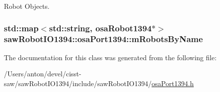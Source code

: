Robot Objects. 

\hypertarget{classsaw_robot_i_o1394_1_1osa_port1394_a43429f6b99e3a27ba60a626d3ab83367}{}
\subsubsection[{m\+Robots\+By\+Name}]{\setlength{\rightskip}{0pt plus 5cm}std\+::map$<$std\+::string, {\bf osa\+Robot1394}$\ast$$>$ saw\+Robot\+I\+O1394\+::osa\+Port1394\+::m\+Robots\+By\+Name\hspace{0.3cm}{\ttfamily [protected]}}\label{classsaw_robot_i_o1394_1_1osa_port1394_a43429f6b99e3a27ba60a626d3ab83367}


The documentation for this class was generated from the following file\+:\begin{DoxyCompactItemize}
\item 
/\+Users/anton/devel/cisst-\/saw/saw\+Robot\+I\+O1394/include/saw\+Robot\+I\+O1394/\hyperlink{osa_port1394_8h}{osa\+Port1394.\+h}\end{DoxyCompactItemize}
